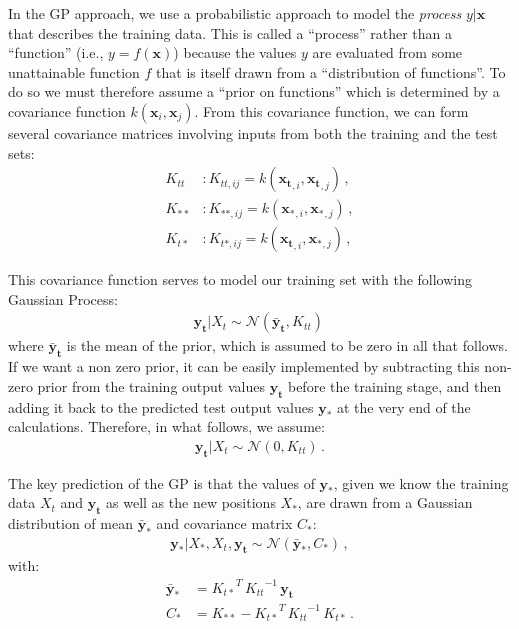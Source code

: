 \documentclass[11pt,a4paper]{article}
\numberwithin{equation}{section}
\begin{document}
In the GP approach, we use a probabilistic approach to model the \emph{process} $y|\mathbf{x}$ that describes the training data. This is called a ``process'' rather than a ``function'' (i.e., $y = f(\mathbf{x})$) because the values $y$ are evaluated from some unattainable function $f$ that is itself drawn from a ``distribution of functions''. To do so we must therefore assume a ``prior on functions'' which is determined by a covariance function $k(\mathbf{x}_i, \mathbf{x}_j)$. From this covariance function, we can form several covariance matrices involving inputs from both the training and the test sets:
\begin{align}
K_{tt} &: K_{tt,ij} = k(\mathbf{x_t}_{,i},\mathbf{x_t}_{,j})\,, \\
K_{**} &: K_{**,ij} = k(\mathbf{x_*}_{,i},\mathbf{x_*}_{,j})\,, \\
K_{t*} &: K_{t*,ij} = k(\mathbf{x_t}_{,i},\mathbf{x_*}_{,j})\,,
\end{align}

This covariance function serves to model our training set with the following Gaussian Process:
\begin{align}
\mathbf{y_t} | X_t \sim \mathcal{N}(\mathbf{\bar{y}_t},K_{tt})\,
\end{align}
where $\mathbf{\bar{y}_t}$ is the mean of the prior, which is assumed to be zero in all that follows. If we want a non zero prior, it can be easily implemented by subtracting this non-zero prior from the training output values $\mathbf{y_t}$ before the training stage, and then adding it back to the predicted test output values $\mathbf{y_*}$ at the very end of the calculations. Therefore, in what follows, we assume:
\begin{align}
\mathbf{y_t} | X_t \sim \mathcal{N}(0,K_{tt})\,. \label{EQ:full_prior}
\end{align}

The key prediction of the GP is that the values of $\mathbf{y_*}$, given we know the training data $X_t$ and $\mathbf{y_t}$ as well as the new positions $X_*$, are drawn from a Gaussian distribution of mean $\mathbf{\bar{y}_*}$ and covariance matrix $C_*$:
\begin{align}
\mathbf{y_*} | X_*, X_t, \mathbf{y_t} \sim \mathcal{N}(\mathbf{\bar{y}_*}, C_*)\,,
\end{align}
with:
\begin{align}
\mathbf{\bar{y}_*} &= {K_{t*}}^T\,{K_{tt}}^{-1}\,\mathbf{y_t}\, \\
C_* &= K_{**} - {K_{t*}}^T\,{K_{tt}}^{-1}\,K_{t*}\,.
\end{align}
\end{document}
